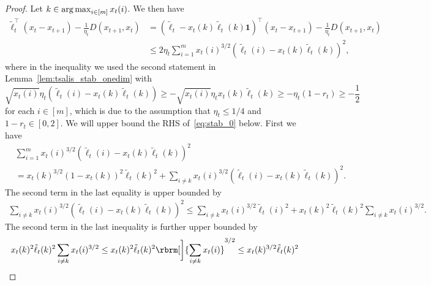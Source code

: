 \begin{proof}
Let $k \in \operatorname*{arg\,max}_{i \in [m]} x_t(i)$.
We then have 
\begin{align}
    \tilde{\ell}_t^\top (x_t - x_{t+1})
    -
    \frac{1}{\eta_t} D(x_{t+1}, x_t)
    &=
    \left(
        \tilde{\ell}_t - x_t(k) \tilde{\ell}_t(k) \mathbf{1}
    \right)^\top 
    (x_t - x_{t+1})
    -
    \frac{1}{\eta_t} D(x_{t+1}, x_t)
    \nonumber \\
    &\leq
    2
    \eta_t
    \sum_{i=1}^m 
    x_t(i)^{3/2} \left( 
        \tilde{\ell}_t(i) - x_t(k) \tilde{\ell}_t(k)
    \right)^2
    ,
    \label{eq:stab_0}
\end{align}
where in the inequality we used  
the second statement in Lemma~\ref{lem:tsalis_stab_onedim}
with
\begin{equation}
    \sqrt{x_t(i)} \eta_t 
    \left( \tilde{\ell}_t(i) -  x_t(k) \tilde{\ell}_t(k) \right)
    \geq
    - \sqrt{x_t(i)} \eta_t x_t(k) \tilde{\ell}_t(k)
    \geq
    - \eta_t (1 - r_t)
    \geq 
    - \frac12
    \nonumber
\end{equation}
for each $i \in [m]$,
which is due to the assumption that $\eta_t \leq 1/4$ and $1 - r_t \in [0, 2]$.
We will upper bound the RHS of~\eqref{eq:stab_0} below.
First we have
\begin{align}
    &
    \sum_{i=1}^m 
    x_t(i)^{3/2} \left( 
        \tilde{\ell}_t(i) - x_t(k) \tilde{\ell}_t(k)
    \right)^2
    \nonumber \\
    &=
    x_t(k)^{3/2}
    \left( 
        1 - x_t(k)
    \right)^2
    \tilde{\ell}_t(k)^2
    +
    \sum_{i \neq k}
    x_t(i)^{3/2} \left( 
        \tilde{\ell}_t(i) - x_t(k) \tilde{\ell}_t(k)
    \right)^2
    .
    \label{eq:stab_1}
\end{align}
The second term in the last equality is upper bounded by
\begin{align}
    \sum_{i \neq k}
    x_t(i)^{3/2} \left( 
        \tilde{\ell}_t(i) - x_t(k) \tilde{\ell}_t(k)
    \right)^2
    \leq
    \sum_{i \neq k}
    x_t(i)^{3/2} 
        \tilde{\ell}_t(i)^2 
    +
    x_t(k)^2 \tilde{\ell}_t(k)^2
    \sum_{i \neq k}
    x_t(i)^{3/2} 
    \label{eq:stab_2}
    .
\end{align}
The second term in the last inequality is further upper bounded by
\begin{align}
    x_t(k)^2 \tilde{\ell}_t(k)^2
    \sum_{i \neq k}
    x_t(i)^{3/2} 
    &\leq
    x_t(k)^2 \tilde{\ell}_t(k)^2
    \rbrm[\bigg]{
        \sum_{i \neq k}
        x_t(i)
    }^{3/2}
    \leq
    x_t(k)^{3/2} \tilde{\ell}_t(k)^2

\end{align}
\end{proof}
